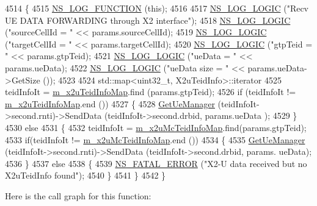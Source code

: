 \begin{DoxyCode}
4514 \{
4515   \hyperlink{log-macros-disabled_8h_a90b90d5bad1f39cb1b64923ea94c0761}{NS\_LOG\_FUNCTION} (\textcolor{keyword}{this});
4516 
4517   \hyperlink{group__logging_ga88acd260151caf2db9c0fc84997f45ce}{NS\_LOG\_LOGIC} (\textcolor{stringliteral}{"Recv UE DATA FORWARDING through X2 interface"});
4518   \hyperlink{group__logging_ga88acd260151caf2db9c0fc84997f45ce}{NS\_LOG\_LOGIC} (\textcolor{stringliteral}{"sourceCellId = "} << params.sourceCellId);
4519   \hyperlink{group__logging_ga88acd260151caf2db9c0fc84997f45ce}{NS\_LOG\_LOGIC} (\textcolor{stringliteral}{"targetCellId = "} << params.targetCellId);
4520   \hyperlink{group__logging_ga88acd260151caf2db9c0fc84997f45ce}{NS\_LOG\_LOGIC} (\textcolor{stringliteral}{"gtpTeid = "} << params.gtpTeid);
4521   \hyperlink{group__logging_ga88acd260151caf2db9c0fc84997f45ce}{NS\_LOG\_LOGIC} (\textcolor{stringliteral}{"ueData = "} << params.ueData);
4522   \hyperlink{group__logging_ga88acd260151caf2db9c0fc84997f45ce}{NS\_LOG\_LOGIC} (\textcolor{stringliteral}{"ueData size = "} << params.ueData->GetSize ());
4523 
4524   std::map<uint32\_t, X2uTeidInfo>::iterator 
4525     teidInfoIt = \hyperlink{classns3_1_1LteEnbRrc_acf64b26e133b693531c511792656cf81}{m\_x2uTeidInfoMap}.find (params.gtpTeid);
4526   \textcolor{keywordflow}{if} (teidInfoIt != \hyperlink{classns3_1_1LteEnbRrc_acf64b26e133b693531c511792656cf81}{m\_x2uTeidInfoMap}.end ())
4527     \{
4528       \hyperlink{classns3_1_1LteEnbRrc_a875653948b565dc50b33f6a0434e32d9}{GetUeManager} (teidInfoIt->second.rnti)->SendData (teidInfoIt->second.drbid, params.ueData
      );
4529     \}
4530   \textcolor{keywordflow}{else}
4531     \{
4532       teidInfoIt = \hyperlink{classns3_1_1LteEnbRrc_a2e6d93354aecf82495a39fa06c33b558}{m\_x2uMcTeidInfoMap}.find(params.gtpTeid);
4533       \textcolor{keywordflow}{if}(teidInfoIt != \hyperlink{classns3_1_1LteEnbRrc_a2e6d93354aecf82495a39fa06c33b558}{m\_x2uMcTeidInfoMap}.end ())
4534       \{
4535         \hyperlink{classns3_1_1LteEnbRrc_a875653948b565dc50b33f6a0434e32d9}{GetUeManager} (teidInfoIt->second.rnti)->SendData (teidInfoIt->second.drbid, params.
      ueData);
4536       \}
4537       \textcolor{keywordflow}{else}
4538       \{
4539         \hyperlink{group__fatal_ga5131d5e3f75d7d4cbfd706ac456fdc85}{NS\_FATAL\_ERROR} (\textcolor{stringliteral}{"X2-U data received but no X2uTeidInfo found"});
4540       \}
4541     \}
4542 \}
\end{DoxyCode}


Here is the call graph for this function\+:


